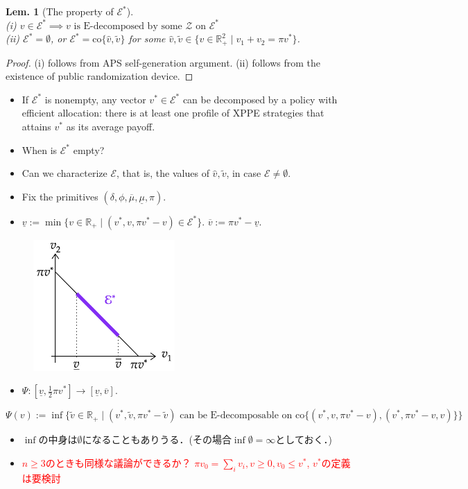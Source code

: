 \documentclass[11pt,a4paper,dvipdfmx]{article}
\newtheorem{lem}{Lem.}
\newcommand{\R}{\mathbb{R}}
\newcommand{\mE}{\mathcal{E}}
\newcommand{\mZ}{\mathcal{Z}}
\renewcommand{\hat}{\widehat}
\renewcommand{\tilde}{\widetilde}
\renewcommand{\bar}{\overline}
\newcommand{\1}{\mathbbm{1}}
\newcommand{\ocomment}[1]{{\textcolor{red}{#1}}}
\begin{document}
\begin{lem}[The property of $\mE^*$] \label{lem1}
	\ \\
	(i) $v \in \mathcal{E}^* \implies \text{$v$ is E-decomposed by some $\mZ$ on $\mE^*$}$ \\
	(ii) $\mE^* = \emptyset$, or $\mE^* = \text{co} \{ \hat{v}, \tilde{v} \}$ for some $\hat{v}, \tilde{v} \in \{v \in \R_+^2 \mid v_1 + v_2 = \pi v^*\}$.
\end{lem}
\begin{proof}
	(i) follows from APS self-generation argument. (ii) follows from the existence of public randomization device.
\end{proof}

\begin{itemize}
	\item If $\mE^*$ is nonempty, any vector $v^* \in \mE^*$ can be decomposed by a policy with efficient allocation: there is at least one profile of XPPE strategies that attains $v^*$ as its average payoff.
	\item When is $\mE^*$ empty?
	\item Can we characterize $\mE$, that is, the values of $\hat{v} , \tilde{v}$, in case $\mE \neq \emptyset$.
	\item Fix the primitives $(\delta, \phi, \bar{\mu}, \underline{\mu}, \pi)$.
	\item $\underline{v} := \min \{v \in \R_+ \mid (v^*, v, \pi v^* - v) \in \mE^* \}$. $\bar{v} := \pi v^* - \underline{v}$.
\end{itemize}
\begin{figure}[H]
	\centering
	\includegraphics[height=5cm]{image/eff_eq.png}
\end{figure}
\begin{itemize}
	\item $\Psi: [\underline{v}, \frac{1}{2}\pi v^*] \to [\underline{v}, \bar{v}]$. 
\end{itemize}
$$
\Psi(v) := \inf \{ \tilde{v} \in \R_+ \mid 
	(v^*, \tilde{v}, \pi v^* - \tilde{v}) \text{ can be E-decomposable on } \text{co}\{(v^*, v, \pi v^* - v), (v^*, \pi v^* - v, v) \}
\}
$$
\begin{itemize}
	\item $\inf$の中身は$\emptyset$になることもありうる．(その場合$\inf \emptyset = \infty$としておく．)
	\item \ocomment{$n \geq 3$のときも同様な議論ができるか？ $\pi v_0 = \sum_i v_i, v \geq 0, v_0 \leq v^*$, $v^*$の定義は要検討}
\end{itemize}
\end{document}
